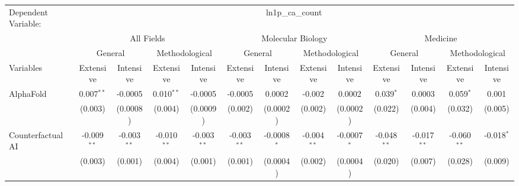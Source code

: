 \begingroup
\centering
\begin{tabular}{lcccccccccccc}
   \tabularnewline \midrule \midrule
   Dependent Variable: & \multicolumn{12}{c}{ln1p\_ca\_count}\\
 & \multicolumn{4}{c}{All Fields} & \multicolumn{4}{c}{Molecular Biology} & \multicolumn{4}{c}{Medicine} \\
\cmidrule(lr){2-5} \cmidrule(lr){6-9} \cmidrule(lr){10-13}
 & \multicolumn{2}{c}{General} & \multicolumn{2}{c}{Methodological} & \multicolumn{2}{c}{General} & \multicolumn{2}{c}{Methodological} & \multicolumn{2}{c}{General} & \multicolumn{2}{c}{Methodological} \\
\cmidrule(lr){2-3} \cmidrule(lr){4-5} \cmidrule(lr){6-7} \cmidrule(lr){8-9} \cmidrule(lr){10-11} \cmidrule(lr){12-13}
Variables & \multicolumn{1}{c}{Extensive} & \multicolumn{1}{c}{Intensive} & \multicolumn{1}{c}{Extensive} & \multicolumn{1}{c}{Intensive} & \multicolumn{1}{c}{Extensive} & \multicolumn{1}{c}{Intensive} & \multicolumn{1}{c}{Extensive} & \multicolumn{1}{c}{Intensive} & \multicolumn{1}{c}{Extensive} & \multicolumn{1}{c}{Intensive} & \multicolumn{1}{c}{Extensive} & \multicolumn{1}{c}{Intensive} \\
\cmidrule(lr){1-1}\cmidrule(lr){2-2} \cmidrule(lr){3-3} \cmidrule(lr){4-4} \cmidrule(lr){5-5} \cmidrule(lr){6-6} \cmidrule(lr){7-7} \cmidrule(lr){8-8} \cmidrule(lr){9-9} \cmidrule(lr){10-10} \cmidrule(lr){11-11} \cmidrule(lr){12-12} \cmidrule(lr){13-13}
   AlphaFold                                & 0.007$^{**}$  & -0.0005        & 0.010$^{**}$  & -0.0005        & -0.0005       & 0.0002        & -0.002        & 0.0002        & 0.039$^{*}$   & 0.0003         & 0.059$^{*}$   & 0.001\\   
                                            & (0.003)       & (0.0008)       & (0.004)       & (0.0009)       & (0.002)       & (0.0002)      & (0.002)       & (0.0002)      & (0.022)       & (0.004)        & (0.032)       & (0.005)\\   
   Counterfactual AI                        & -0.009$^{**}$ & -0.003$^{**}$  & -0.010$^{**}$ & -0.003$^{**}$  & -0.003$^{**}$ & -0.0008$^{*}$ & -0.004$^{**}$ & -0.0007$^{*}$ & -0.048$^{**}$ & -0.017$^{**}$  & -0.060$^{**}$ & -0.018$^{*}$\\   
                                            & (0.003)       & (0.001)        & (0.004)       & (0.001)        & (0.001)       & (0.0004)      & (0.002)       & (0.0004)      & (0.020)       & (0.007)        & (0.028)       & (0.009)\\   

\end{tabular}
